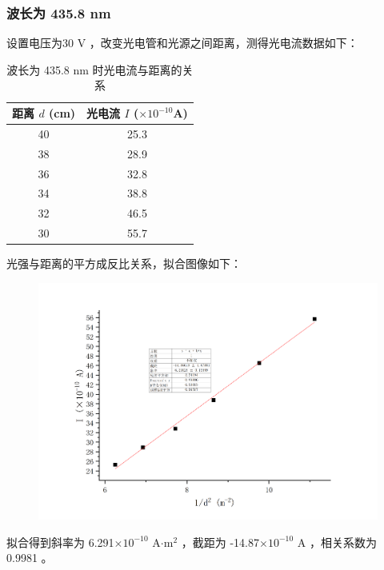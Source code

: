 \documentclass[a4paper]{extarticle}
\begin{document}
    \subsubsection{波长为 435.8 nm}
    设置电压为30 V ，改变光电管和光源之间距离，测得光电流数据如下：
    \begin{table}[H]
        \centering
        \caption{波长为 435.8 nm 时光电流与距离的关系}
        \begin{tabular}{cc}
            \toprule
            距离 $d$ (cm) & 光电流 $I$ ($\times10^{-10}$A)\\
            \midrule
            40 & 25.3\\
            38 & 28.9\\
            36 & 32.8\\
            34 & 38.8\\
            32 & 46.5\\
            30 & 55.7\\
            \bottomrule
        \end{tabular}
    \end{table}
    光强与距离的平方成反比关系，拟合图像如下：
    \begin{figure}[H]
        \centering
        \includegraphics[width=0.8\linewidth]{5.png}
    \end{figure}
    拟合得到斜率为 6.291$\times10^{-10}$ A$\cdot$m$^2$ ，截距为 -14.87$\times10^{-10}$ A ，相关系数为 0.9981 。
\end{document}
